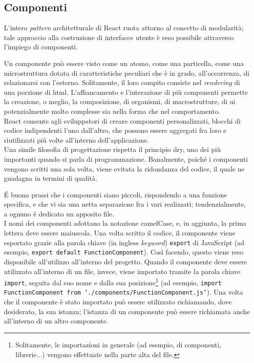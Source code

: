\subsection{Componenti}
L'intero \textit{pattern} architetturale di React ruota attorno al concetto di modularità; tale approccio alla costruzione di interfacce utente è reso possibile attraverso l'impiego di componenti.

Un componente può essere visto come un atomo, come una particella, come una microstruttura dotata di caratteristiche peculiari che è in grado, all'occorrenza, di relazionarsi con l'esterno. Solitamente, il loro compito consiste nel \textit{rendering} di una porzione di \gls{html}. L'affiancamento e l'interazione di più componenti permette la creazione, o meglio, la composizione, di organismi, di macrostrutture, di \acrshort{ui} potenzialmente molto complesse sia nella forma che nel comportamento.\\
React consente agli sviluppatori di creare componenti personalizzati, blocchi di codice indipendenti l'uno dall'altro, che possono essere aggregati fra loro e riutilizzati più volte all'interno dell'applicazione.\\
Una simile filosofia di progettazione rispetta il principio \acrfull{dry}, uno dei più importanti quando si parla di programmazione. Banalmente, poiché i componenti vengono scritti una sola volta, viene evitata la ridondanza del codice, il quale ne guadagna in termini di qualità.

É buona prassi che i componenti siano piccoli, rispondendo a una funzione specifica, e che vi sia una netta separazione fra i vari realizzati; tendenzialmente, a ognuno è dedicato un apposito file.\\
I nomi dei componenti adottano la notazione camelCase, e, in aggiunta, la prima lettera deve essere maiuscola.
Una volta scritto il codice, il componente viene esportato grazie alla parola chiave (in inglese \textit{keyword}) \texttt{export} di JavaScript (ad esempio, \texttt{export default FunctionComponent}). Così facendo, questo viene reso disponibile all'utilizzo all'interno del progetto. Quando il componente deve essere utilizzato all'interno di un file, invece, viene importato tramite la parola chiave \texttt{import}, seguita dal suo nome e dalla sua posizione\footnote{Solitamente, le importazioni in generale (ad esempio, di componenti, librerie...) vengono effettuate nella parte alta del file.} (ad esempio, \texttt{import FunctionComponent from './components/FunctionComponent.js'}). Una volta che il componente è stato importato può essere utilizzato richiamando, dove desiderato, la sua istanza; l'istanza di un componente può essere richiamata anche all'interno di un altro componente.

